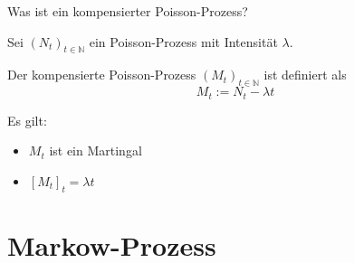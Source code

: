 \begin{QandA}
    \item Was ist ein kompensierter Poisson-Prozess?
    \begin{answered}
        Sei $(N_t)_{t \in \mathbb{N}}$ ein Poisson-Prozess mit Intensität $\lambda$.

        Der kompensierte Poisson-Prozess $(M_t)_{t \in \mathbb{N}}$ ist definiert als
        \[
            M_t := N_t - \lambda t
        \]

        Es gilt:
        \begin{itemize}
            \item $M_t$ ist ein Martingal
            \item $[M_t]_t = \lambda t$
        \end{itemize}
    \end{answered}
\end{QandA}

\newpage
\section*{Markow-Prozess}

